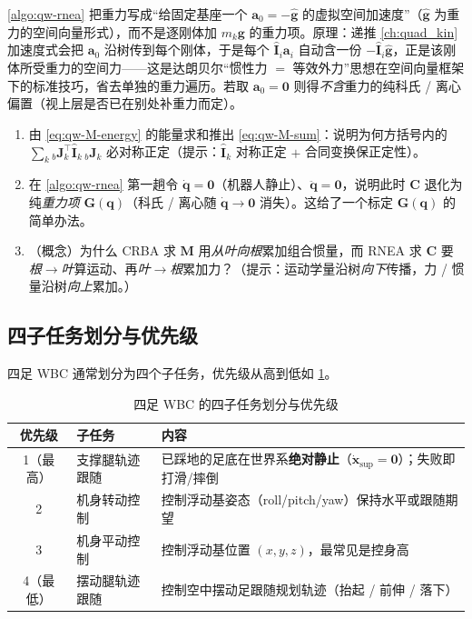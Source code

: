 \begin{note}[重力以基座加速度注入的等效原理]\label{note:qw-gravity-inject}
\cref{algo:qw-rnea} 把重力写成“给固定基座一个 $\boldsymbol{a}_0=-\hat{\boldsymbol{g}}$ 的虚拟空间加速度”（$\hat{\boldsymbol{g}}$ 为重力的空间向量形式），而不是逐刚体加 $m_k\boldsymbol{g}$ 的重力项。原理：递推 \cref{ch:quad_kin} 加速度式会把 $\boldsymbol{a}_0$ 沿树传到每个刚体，于是每个 $\hat{\mathbf{I}}_i\boldsymbol{a}_i$ 自动含一份 $-\hat{\mathbf{I}}_i\hat{\boldsymbol{g}}$，正是该刚体所受重力的空间力——这是达朗贝尔“惯性力 $=$ 等效外力”思想在空间向量框架下的标准技巧，省去单独的重力遍历。若取 $\boldsymbol{a}_0=\mathbf{0}$ 则得\emph{不含}重力的纯科氏 / 离心偏置（视上层是否已在别处补重力而定）。
\end{note}

\begin{practice}
\begin{enumerate}
  \item 由 \cref{eq:qw-M-energy} 的能量求和推出 \cref{eq:qw-M-sum}：说明为何方括号内的 $\sum_k{}_{b}\boldsymbol{J}_k^\top\hat{\mathbf{I}}_k\,{}_{b}\boldsymbol{J}_k$ 必对称正定（提示：$\hat{\mathbf{I}}_k$ 对称正定 $+$ 合同变换保正定性）。
  \item 在 \cref{algo:qw-rnea} 第一趟令 $\dot{\boldsymbol{q}}=\mathbf{0}$（机器人静止）、$\ddot{\boldsymbol{q}}=\mathbf{0}$，说明此时 $\boldsymbol{C}$ 退化为纯\emph{重力项} $\boldsymbol{G}(\boldsymbol{q})$（科氏 / 离心随 $\dot{\boldsymbol{q}}\to\mathbf{0}$ 消失）。这给了一个标定 $\boldsymbol{G}(\boldsymbol{q})$ 的简单办法。
  \item （概念）为什么 CRBA 求 $\boldsymbol{M}$ 用\emph{从叶向根}累加组合惯量，而 RNEA 求 $\boldsymbol{C}$ 要\emph{根$\to$叶}算运动、再\emph{叶$\to$根}累加力？（提示：运动学量沿树\emph{向下}传播，力 / 惯量沿树\emph{向上}累加。）
\end{enumerate}
\end{practice}

\subsection{四子任务划分与优先级}
\label{subsec:qw-subtasks}

四足 WBC 通常划分为四个子任务，优先级从高到低如 \cref{tab:qw-subtasks}。

\begin{table}[H]\centering\small
\caption{四足 WBC 的四子任务划分与优先级\cite{yu2021quadruped}}
\begin{tabular}{clp{}}
\toprule
优先级 & 子任务 & 内容 \\
\midrule
1（最高）& 支撑腿轨迹跟随 & 已踩地的足底在世界系\textbf{绝对静止}（$\dot{\boldsymbol{x}}_{\mathrm{sup}}=\mathbf{0}$）；失败即打滑/摔倒 \\
2 & 机身转动控制 & 控制浮动基姿态（roll/pitch/yaw）保持水平或跟随期望 \\
3 & 机身平动控制 & 控制浮动基位置 $(x,y,z)$，最常见是控身高 \\
4（最低）& 摆动腿轨迹跟随 & 控制空中摆动足跟随规划轨迹（抬起 / 前伸 / 落下）\\
\bottomrule
\end{tabular}
\label{tab:qw-subtasks}
\end{table}

